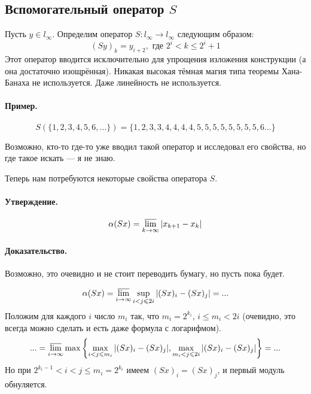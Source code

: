 \subsection{Вспомогательный оператор $S$}
Пусть $y\in l_\infty$.
Определим оператор $S:l_\infty \to l_\infty$ следующим образом:
\begin{equation}\label{operator_S}
	(Sy)_k = y_{i+2}, \mbox{ где } 2^i < k \leq 2^i+1
\end{equation}
Этот оператор вводится исключительно для упрощения изложения конструкции
(а она достаточно изощрённая).
Никакая высокая тёмная магия типа теоремы Хана-Банаха не используется.
Даже линейность не используется.

\paragraph{Пример.}
$$
	S(\{1,2,3,4,5,6, ...\}) = \{1,2,3,3,4,4,4,4,5,5,5,5,5,5,5,5,6...\}
$$

Возможно, кто-то где-то уже вводил такой оператор и исследовал его свойства,
но где такое искать --- я не знаю.


Теперь нам потребуются некоторые свойства оператора $S$.

\paragraph{Утверждение.}
\begin{equation}\label{alpha_S}
	\alpha(Sx) = \varlimsup_{k\to\infty} |x_{k+1} - x_{k}|
\end{equation}

\paragraph{Доказательство.}
Возможно, это очевидно и не стоит переводить бумагу, но пусть пока будет.

\begin{equation*}
	\alpha(Sx) =
	\varlimsup_{i\to\infty} \sup_{i < j \leq 2i} | (Sx)_i - (Sx)_j | = ...
\end{equation*}
Положим для каждого $i$ число $m_i$ так,
что $m_i = 2^{k_i}$, $i \leq m_i < 2i$
(очевидно, это всегда можно сделать и есть даже формула с логарифмом).
\begin{equation*}
	... =
	\varlimsup_{i\to\infty} \max \left\{
		\max_{i   < j \leq m_i} | (Sx)_i - (Sx)_j |,
		\max_{m_i < j \leq 2i } | (Sx)_i - (Sx)_j |
	\right\} =
	...
\end{equation*}
Но при $2^{k_i - 1} < i < j \leq m_i = 2^{k_i}$
имеем $(Sx)_i = (Sx)_j$, и первый модуль обнуляется.

